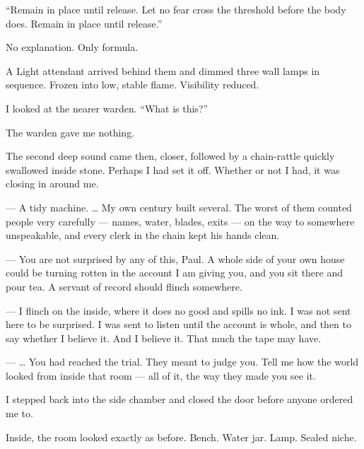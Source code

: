 ``Remain in place until release. Let no fear cross the threshold before the body does. Remain in place until release.''\par

No explanation. Only formula.\par

A Light attendant arrived behind them and dimmed three wall lamps in sequence. Frozen into low, stable flame. Visibility reduced.\par

I looked at the nearer warden. ``What is this?''\par

The warden gave me nothing.\par

The second deep sound came then, closer, followed by a chain-rattle quickly swallowed inside stone. Perhaps I had set it off. Whether or not I had, it was closing in around me.\par

\ornament

\begin{room}

--- A tidy machine. \ldots{} My own century built several. The worst of them counted people very carefully --- names, water, blades, exits --- on the way to somewhere unspeakable, and every clerk in the chain kept his hands clean.

--- You are not surprised by any of this, Paul. A whole side of your own house could be turning rotten in the account I am giving you, and you sit there and pour tea. A servant of record should flinch somewhere.

--- I flinch on the inside, where it does no good and spills no ink. I was not sent here to be surprised. I was sent to listen until the account is whole, and then to say whether I believe it. And I believe it. That much the tape may have.

--- \ldots{} You had reached the trial. They meant to judge you. Tell me how the world looked from inside that room --- all of it, the way they made you see it.

\end{room}

\ornament

I stepped back into the side chamber and closed the door before anyone ordered me to.\par

Inside, the room looked exactly as before. Bench. Water jar. Lamp. Sealed niche.\par

